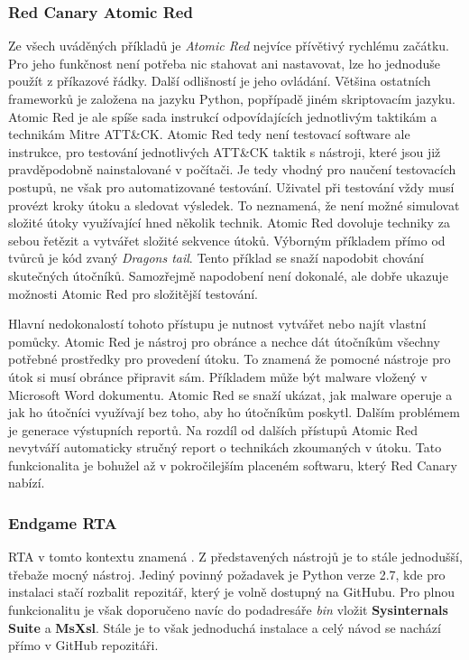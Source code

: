 \subsubsection{Red Canary Atomic Red}
Ze všech uváděných příkladů je \textit{Atomic Red} nejvíce přívětivý rychlému začátku.
Pro jeho funkčnost není potřeba nic stahovat ani nastavovat, lze ho jednoduše použít z příkazové řádky\cite{redcanary_atomic_red}.
Další odlišností je jeho ovládání.
Většina ostatních frameworků je založena na jazyku Python, popřípadě jiném skriptovacím jazyku.
Atomic Red je ale spíše sada instrukcí odpovídajících jednotlivým taktikám a technikám Mitre ATT\&CK\@.
Atomic Red tedy není testovací software ale instrukce, pro testování jednotlivých ATT\&CK taktik s nástroji, které jsou již pravděpodobně nainstalované v počítači.
Je tedy vhodný pro naučení testovacích postupů, ne však pro automatizované testování.
Uživatel při testování vždy musí provézt kroky útoku a sledovat výsledek.
To neznamená, že není možné simulovat složité útoky využívající hned několik technik.
Atomic Red dovoluje techniky za sebou řetězit a vytvářet složité sekvence útoků.
Výborným příkladem přímo od tvůrců je kód zvaný \textit{Dragons tail}\cite{redcanary_dragons_tail}.
Tento příklad se snaží napodobit chování skutečných útočníků.
Samozřejmě napodobení není dokonalé, ale dobře ukazuje možnosti Atomic Red pro složitější testování.\cite{csoonline_4_testing_frameworks}

Hlavní nedokonalostí tohoto přístupu je nutnost vytvářet nebo najít vlastní pomůcky.
Atomic Red je nástroj pro obránce a nechce dát útočníkům všechny potřebné prostředky pro provedení útoku.
To znamená že pomocné nástroje pro útok si musí obránce připravit sám.
Příkladem může být malware vložený v Microsoft Word dokumentu.
Atomic Red se snaží ukázat, jak malware operuje a jak ho útočníci využívají bez toho, aby ho útočníkům poskytl.
Dalším problémem je generace výstupních reportů.
Na rozdíl od dalších přístupů Atomic Red nevytváří automaticky stručný report o technikách zkoumaných v útoku.
Tato funkcionalita je bohužel až v pokročilejším placeném softwaru, který Red Canary nabízí.\cite{csoonline_4_testing_frameworks}


\subsubsection{Endgame RTA}
\ac{RTA} v tomto kontextu znamená .
Z představených nástrojů je to stále jednodušší, třebaže mocný nástroj.
Jediný povinný požadavek je Python verze 2.7, kde pro instalaci stačí rozbalit repozitář, který je volně dostupný na GitHubu.
Pro plnou funkcionalitu je však doporučeno navíc do podadresáře \textit{bin} vložit \textbf{Sysinternals Suite} a \textbf{MsXsl}.
Stále je to však jednoduchá instalace a celý návod se nachází přímo v GitHub repozitáři.\cite{endgame_rta}

